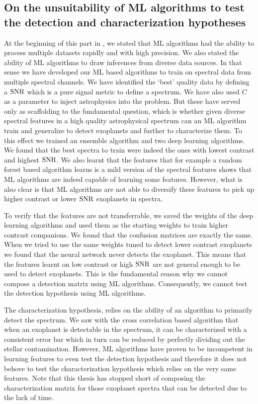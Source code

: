 \subsection{On the unsuitability of ML algorithms to test the detection and characterization hypotheses}
At the beginning of this part in , we stated that ML algorithms had the ability to process multiple datasets rapidly and with high precision. 
We also stated the ability of ML algorithms to draw inferences from diverse data sources.
In that sense we have developed our ML based algorithms to train on spectral data from multiple spectral channels.
We have identified the `best' quality data by defining a $\rm{SNR}$ which is a pure signal metric to define a spectrum.
We have also used $C$ as a parameter to inject astrophysics into the problem.
But these have served only as scaffolding to the fundamental question, which is whether given diverse spectral features in a high quality astrophysical spectrum can an ML algorithm train and generalize to detect exoplanets and further to characterize them.
To this effect we trained an ensemble algorithm and two deep learning algorithms.
We found that the best spectra to train were indeed the ones with lowest contrast and highest $\rm{SNR}$.
We also learnt that the features that for example a random forest based algorithm learns is a mild version of the spectral features shows that ML algorithms are indeed capable of learning some features.
However, what is also clear is that ML algorithms are not able to diversify these features to pick up higher contrast or lower $\rm{SNR}$ exoplanets in spectra.

To verify that the features are not transferrable, we saved the weights of the deep learning algorithms and used them as the starting weights to train higher contrast companions. 
We found that the confusion matrices are exactly the same. 
When we tried to use the same weights tuned to detect lower contrast exoplanets we found that the neural network never detects the exoplanet. 
This means that the features learnt on low contrast or high $\rm{SNR}$ are not general enough to be used to detect exoplanets.
This is the fundamental reason why we cannot compose a detection matrix using ML algorithms.
Consequently, we cannot test the detection hypothesis using ML algorithms.

The characterization hypothesis, relies on the ability of an algorithm to primarily detect the spectrum. 
We saw with the cross correlation based algorithm that when an exoplanet is detectable in the spectrum, it can be characterized with a consistent error bar which in turn can be reduced by perfectly dividing out the stellar contamination.
However, ML algorithms have proven to be incompetent in learning features to even test the detection hypothesis and therefore it does not behove to test the characterization hypothesis which relies on the very same features.
Note that this thesis has stopped short of composing the characterization matrix for those exoplanet spectra that can be detected due to the lack of time.

